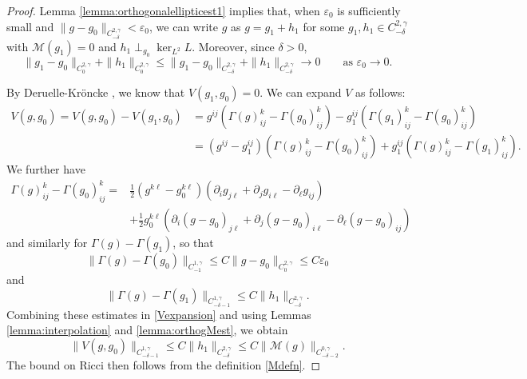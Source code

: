 \documentclass[12pt]{amsart}
\newcommand{\calM}{\mathcal{M}}
\newcommand{\p}{{ \partial}}
\renewcommand{\1}{{\mathbf 1}}
\renewcommand{\p}{{\partial}}
\newcommand{\eps}{{\varepsilon}}
\theoremstyle{others}
\numberwithin{equation}{section}
\begin{document}
\begin{proof}
    Lemma \ref{lemma:orthogonalellipticest1} implies that, when $\eps_0$ is sufficiently small and $\| g - g_0 \|_{C^{2, \gamma}_{-\delta}} < \eps_0$, we can write $g$ as $g = g_1 + h_1$ for some $g_1, h_1 \in  C^{2, \gamma}_{-\delta}$ with $\mathcal M (g_1) = 0$ and $h_1 \perp_{g_0} \ker_{L^2} L $.
    Moreover, since $\delta > 0$,
    \begin{equation} \label{proof Ric and V bounds, eqn small g_1-g_0 and h_1}
        \| g_1 - g_0 \|_{C^{2, \gamma}_{0}} + \| h_1 \|_{C^{2, \gamma}_0} 
        \le \| g_1 - g_0 \|_{C^{2, \gamma}_{-\delta}} + \| h_1 \|_{C^{2, \gamma}_{-\delta}} \to 0 \qquad \text{as } \eps_0 \to 0. 
    \end{equation}
    

    By Deruelle-Kr{\"o}ncke \cite[Theorem 2.7]{DeruelleKroncke20}, %
    we know that $V(g_1, g_0) = 0.$ We can expand $V$ as follows:
    \begin{equation}\label{Vexpansion}
    \begin{split}
        V(g, g_0) = V(g, g_0) - V(g_1, g_0) & = g^{ij} \left( \Gamma(g)^k_{ij} - \Gamma(g_0)^k_{ij}\right) - g_1^{ij} \left( \Gamma(g_1)^k_{ij} - \Gamma(g_0)^k_{ij}\right) \\
        & = \left( g^{ij} - g_1^{ij} \right) \left( \Gamma(g)^k_{ij} - \Gamma(g_0)^k_{ij} \right) + g_1^{ij} \left( \Gamma(g)^k_{ij} - \Gamma(g_1)^k_{ij} \right).
        \end{split}
    \end{equation}
    We further have
    \begin{align*}
        \Gamma(g)^k_{ij} - \Gamma(g_0)^k_{ij} 
        ={}& \frac12 \left( g^{k\ell} - g_0^{k\ell} \right) \left( \p_i g_{j \ell} + \p_j g_{i \ell} - \p_\ell g_{ij}  \right) \\
        &+ \frac12 g_0^{k \ell} \left( \p_i (g - g_0)_{j\ell} + \p_j (g - g_0 )_{i \ell} - \p_\ell ( g-g_0)_{ij}  \right)
    \end{align*}
    and similarly for $\Gamma(g) - \Gamma(g_1)$,
    so that
    $$ \| \Gamma(g) - \Gamma(g_0) \|_{C^{1,\gamma}_{- 1}} \leq C \|g - g_0\|_{C^{2,\gamma}_{0}} \leq C\eps_0$$
    and
      $$ \| \Gamma(g) - \Gamma(g_1) \|_{C^{1,\gamma}_{-\delta - 1}} \leq C \|h_1\|_{C^{2,\gamma}_{-\delta}}.$$
    Combining these estimates in \eqref{Vexpansion} and using Lemmas \ref{lemma:interpolation} and \ref{lemma:orthogMest}, we obtain
      $$\|V(g,g_0) \|_{C^{1,\gamma}_{-\delta-1}} \leq C\| h_1 \|_{C^{2,\gamma}_{-\delta}} \leq C \| \calM(g) \|_{C^{0, \gamma}_{-\delta - 2}}.$$
    The bound on Ricci then follows from the definition \eqref{Mdefn}.
\end{proof}
\end{document}
